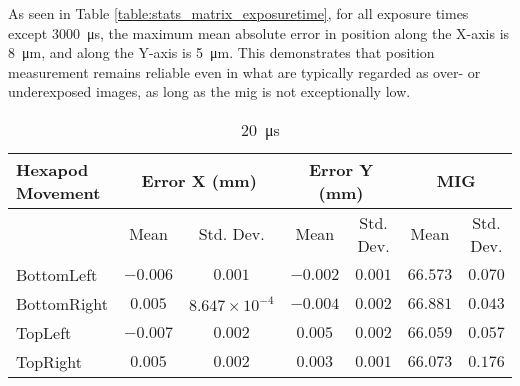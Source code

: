 \vspace{5mm}
\noindent As seen in Table \ref{table:stats_matrix_exposuretime}, for all exposure times except \SI{3000}{\micro\second}, the maximum mean absolute error in position along the X-axis is \SI{8}{\micro\meter}, and along the Y-axis is \SI{5}{\micro\meter}. This demonstrates that position measurement remains reliable even in what are typically regarded as over- or underexposed images, as long as the \gls{mig} is not exceptionally low.

\begin{table}[h]
    \centering
    \begin{subtable}{\textwidth}
        \centering
        \footnotesize
        \begin{tabular}{lcccccc}
            \toprule
            Hexapod Movement & \multicolumn{2}{c}{Error X (mm)} & \multicolumn{2}{c}{Error Y (mm)} & \multicolumn{2}{c}{MIG}  \\
            \midrule
            & \multicolumn{1}{c}{Mean} & \multicolumn{1}{c}{Std. Dev.} & \multicolumn{1}{c}{Mean} & \multicolumn{1}{c}{Std. Dev.} & \multicolumn{1}{c}{Mean} & \multicolumn{1}{c}{Std. Dev.} \\
            \midrule
            \textsf{BottomLeft} & $-0.006$ & $0.001$ & $-0.002$ & $0.001$ & $66.573$ & $0.070$ \\
            \textsf{BottomRight} & $0.005$ & $8.647\times10^{-4}$ & $-0.004$ & $0.002$ & $66.881$ & $0.043$ \\
            \textsf{TopLeft} & $-0.007$ & $0.002$ & $0.005$ & $0.002$ & $66.059$ & $0.057$ \\
            \textsf{TopRight} & $0.005$ & $0.002$ & $0.003$ & $0.001$ & $66.073$ & $0.176$ \\
            \bottomrule
        \end{tabular}
        \caption{\SI{20}{\micro\second}}
    \end{subtable}

    \vspace{10pt}


\end{table}
